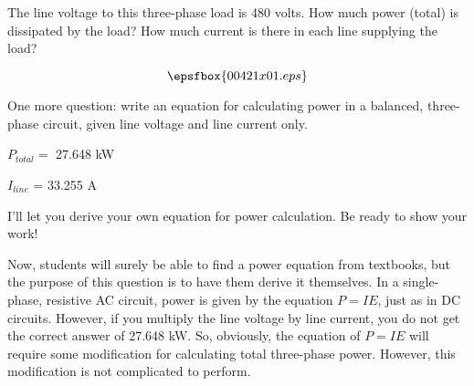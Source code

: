 

The line voltage to this three-phase load is 480 volts.  How much power (total) is dissipated by the load?  How much current is there in each line supplying the load?

$$\epsfbox{00421x01.eps}$$

One more question: write an equation for calculating power in a balanced, three-phase circuit, given line voltage and line current only.







$P_{total} =$ 27.648 kW

$I_{line}$ = 33.255 A

\vskip 5pt

I'll let you derive your own equation for power calculation.  Be ready to show your work!







Now, students will surely be able to find a power equation from textbooks, but the purpose of this question is to have them derive it themselves.  In a single-phase, resistive AC circuit, power is given by the equation $P = I E$, just as in DC circuits.  However, if you multiply the line voltage by line current, you do not get the correct answer of 27.648 kW.  So, obviously, the equation of $P = I E$ will require some modification for calculating total three-phase power.  However, this modification is not complicated to perform.




